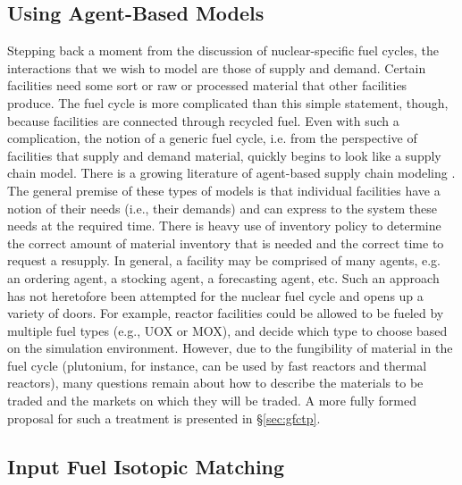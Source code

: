 \subsection{Using Agent-Based Models}

Stepping back a moment from the discussion of nuclear-specific fuel cycles, the
interactions that we wish to model are those of supply and demand. Certain
facilities need some sort or raw or processed material that other facilities
produce. The fuel cycle is more complicated than this simple statement, though,
because facilities are connected through recycled fuel. Even with such a
complication, the notion of a generic fuel cycle, i.e. from the perspective of
facilities that supply and demand material, quickly begins to look like a supply
chain model. There is a growing literature of agent-based supply chain modeling
\cite{swaminathan_modeling_1998,julka_agent-based_2002,van_der_zee_modeling_2005,chatfield_multi-formalism_2007,holmgren_agent_2007}.
The general premise of these types of models is that individual facilities have
a notion of their needs (i.e., their demands) and can express to the system
these needs at the required time. There is heavy use of inventory policy to
determine the correct amount of material inventory that is needed and the
correct time to request a resupply. In general, a facility may be comprised of
many agents, e.g. an ordering agent, a stocking agent, a forecasting agent,
etc. Such an approach has not heretofore been attempted for the nuclear fuel
cycle and opens up a variety of doors. For example, reactor facilities could be
allowed to be fueled by multiple fuel types (e.g., UOX or MOX), and decide which
type to choose based on the simulation environment. However, due to the
fungibility of material in the fuel cycle (plutonium, for instance, can be used
by fast reactors and thermal reactors), many questions remain about how to
describe the materials to be traded and the markets on which they will be
traded. A more fully formed proposal for such a treatment is presented in
\S\ref{sec:gfctp}.

\subsection{Input Fuel Isotopic Matching}

